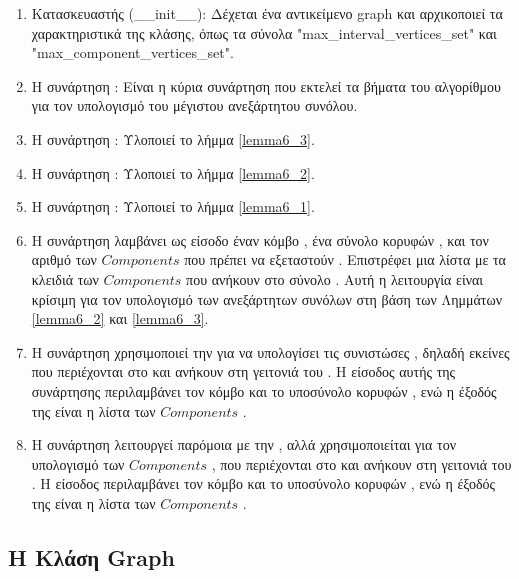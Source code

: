 \begin{enumerate}
	\item Κατασκευαστής (\_\_init\_\_): Δέχεται ένα αντικείμενο  graph και αρχικοποιεί τα χαρακτηριστικά της κλάσης, όπως τα σύνολα "max\_interval\_vertices\_set" και "max\_component\_vertices\_set".
	\item H συνάρτηση : Είναι η κύρια συνάρτηση που εκτελεί τα βήματα του αλγορίθμου για τον υπολογισμό του μέγιστου ανεξάρτητου συνόλου.
	\item Η συνάρτηση : Υλοποιεί το λήμμα \ref{lemma6_3}.
	\item H συνάρτηση : Υλοποιεί το λήμμα \ref{lemma6_2}.
	\item H συνάρτηση : Υλοποιεί το λήμμα \ref{lemma6_1}.
	\item Η συνάρτηση  λαμβάνει ως είσοδο έναν κόμβο , ένα σύνολο κορυφών , και τον αριθμό των $Components$ που πρέπει να εξεταστούν . Επιστρέφει μια λίστα με τα κλειδιά των $Components$ που ανήκουν στο σύνολο . Αυτή η λειτουργία είναι κρίσιμη για τον υπολογισμό των ανεξάρτητων συνόλων στη βάση των Λημμάτων \ref{lemma6_2} και \ref{lemma6_3}.
	\item Η συνάρτηση  χρησιμοποιεί την  για να υπολογίσει τις συνιστώσες , δηλαδή εκείνες που περιέχονται στο  και ανήκουν στη γειτονιά του . Η είσοδος αυτής της συνάρτησης περιλαμβάνει τον κόμβο  και το υποσύνολο κορυφών , ενώ η έξοδός της είναι η λίστα των $Components$ .
	\item Η συνάρτηση  λειτουργεί παρόμοια με την , αλλά χρησιμοποιείται για τον υπολογισμό των $Components$ , που περιέχονται στο  και ανήκουν στη γειτονιά του . Η είσοδος περιλαμβάνει τον κόμβο  και το υποσύνολο κορυφών , ενώ η έξοδός της είναι η λίστα των $Components$ .
\end{enumerate}
\subsection{H Kλάση Graph}




